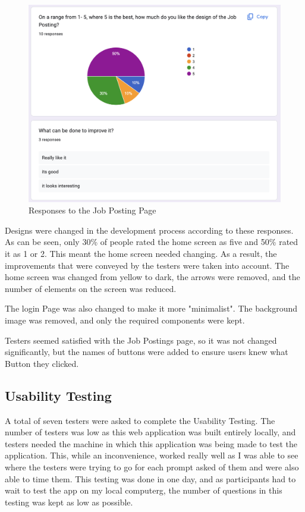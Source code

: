 \begin{figure}
    \centering
    \includegraphics[width=140mm]{Figures/job-posting.png}
    \caption{Responses to the Job Posting Page}
    \label{fig:job-posting-responses}
\end{figure}

Designs were changed in the development process according to these responses. As can be seen, only 30\% of people rated the home screen as five and 50\% rated it as 1 or 2. This meant the home screen needed changing. As a result, the improvements that were conveyed by the testers were taken into account. The home screen was changed from yellow to dark, the arrows were removed, and the number of elements on the screen was reduced.

The login Page was also changed to make it more "minimalist". The background image was removed, and only the required components were kept.

Testers seemed satisfied with the Job Postings page, so it was not changed significantly, but the names of buttons were added to ensure users knew what Button they clicked.

\subsection{Usability Testing}
A total of seven testers were asked to complete the Usability Testing. The number of testers was low as this web application was built entirely locally, and testers needed the machine in which this application was being made to test the application. This, while an inconvenience, worked really well as I was able to see where the testers were trying to go for each prompt asked of them and were also able to time them. This testing was done in one day, and as participants had to wait to test the app on my local computerg, the number of questions in this testing was kept as low as possible. 

